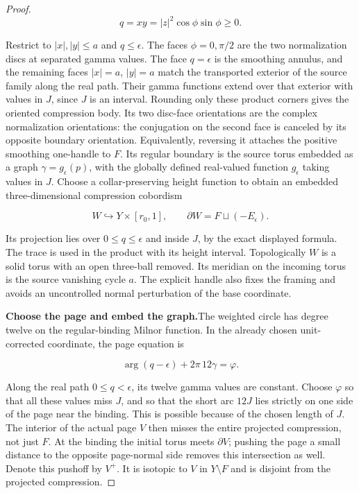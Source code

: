 \begin{proof}
\[
 q=xy=|z|^2\cos\phi\sin\phi\geq0.
\]

Restrict to \(|x|,|y|\leq a\) and \(q\leq\epsilon\).
The faces \(\phi=0,\pi/2\) are the two normalization discs at
separated gamma values.  The face \(q=\epsilon\) is the smoothing
annulus, and the remaining faces \(|x|=a\), \(|y|=a\) match the
transported exterior of the source family along the real path.
Their gamma functions extend over that exterior with values in
\(J\), since \(J\) is an interval.  Rounding only these product
corners gives the oriented compression body.  Its two disc-face
orientations are the complex normalization orientations: the
conjugation on the second face is canceled by its opposite boundary
orientation.  Equivalently, reversing it attaches the positive
smoothing one-handle to \(F\).  Its regular boundary is the source
torus embedded as a graph \(\gamma=g_\epsilon(p)\), with the
globally defined real-valued function \(g_\epsilon\) taking values
in \(J\).  Choose a collar-preserving height function to obtain
an embedded three-dimensional compression cobordism

\[
 W\hookrightarrow Y\times[r_0,1],\qquad
 \partial W=F\sqcup(-E_\epsilon).
\]

Its projection lies over \(0\leq q\leq\epsilon\) and inside \(J\),
by the exact displayed formula.  The trace is used in the product
with its height interval.  Topologically \(W\) is a solid torus
with an open three-ball removed.  Its meridian on the incoming
torus is the source vanishing cycle \(a\).  The explicit handle
also fixes the framing and avoids an uncontrolled normal
perturbation of the base coordinate.

\par\medskip\noindent\textbf{Choose the page and embed the graph.}\enspace The weighted circle
has degree twelve on the regular-binding Milnor function.  In the
already chosen unit-corrected coordinate, the page equation is

\[
 \arg(q-\epsilon)+2\pi\,12\gamma=\varphi.
\]

Along the real path \(0\leq q<\epsilon\), its twelve gamma values
are constant.  Choose \(\varphi\) so that all these values miss
\(J\), and so that the short arc \(12J\) lies strictly on one side
of the page near the binding.  This is possible because of the
chosen length of \(J\).  The interior of the actual page \(V\)
then misses the entire projected compression, not just \(F\).
At the binding the initial torus meets \(\partial V\); pushing the
page a small distance to the opposite page-normal side removes this
intersection as well.  Denote this pushoff by \(V^+\).  It is
isotopic to \(V\) in \(Y\setminus F\) and is disjoint from the
projected compression.


\end{proof}

